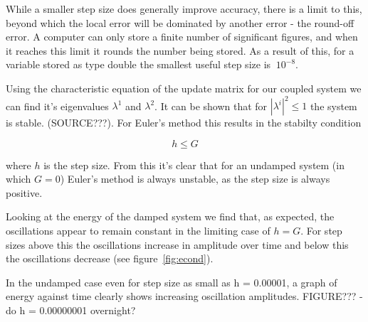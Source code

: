 \documentclass[a4paper,11pt,twoside]{article}
\begin{document}

While a smaller step size does generally improve accuracy, there is 
a limit to this, beyond which the local error will be dominated by 
another error - the round-off error. A computer can only store a 
finite number of significant figures, and when it reaches this limit 
it rounds the number being stored. As a result of this, for a variable 
stored as type double the smallest useful step size is \(~10^{-8}\).

Using the characteristic equation of the update matrix for our coupled 
system we can find it's eigenvalues \(\lambda^{1}\) and \(\lambda^{2}\). 
It can be shown that for \(|\lambda^{i}|^{2} \leq 1\) the system is stable.
(SOURCE???). For Euler's method this results in the stabilty condition

\begin{equation}
	\label{eq:econd}
	h \leq G
\end{equation}

where \(h\) is the step size.
From this it's clear that for an undamped system (in which \(G=0\))
Euler's method is always unstable, as the step size is always positive.

Looking at the energy of the damped system
we find that, as expected, the oscillations 
appear to remain constant in the limiting case of \(h = G\). For step 
sizes above this the oscillations increase in amplitude over time 
and below this the oscillations 
decrease (see figure~\ref{fig:econd}).

In the undamped case even for step size as small as h = 0.00001, 
a graph of energy against time clearly shows increasing oscillation 
amplitudes.
FIGURE??? - do h = 0.00000001 overnight?
\end{document}
